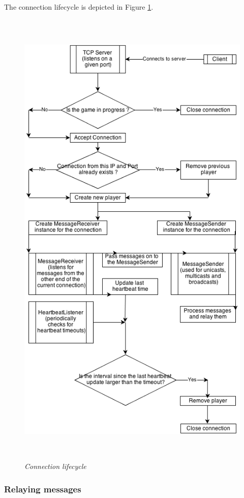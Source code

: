 \documentclass{article}
\begin{document}
The connection lifecycle is depicted in Figure \ref{fig:connectionLifecycle}.

\begin{figure}
\includegraphics[height=9.00in,width=5.00in]{./images/diagrams/connection_lifecycle.png}  
\caption{\small \sl Connection lifecycle \label{fig:connectionLifecycle}}
\end{figure}

\subsubsection{Relaying messages}
\end{document}
